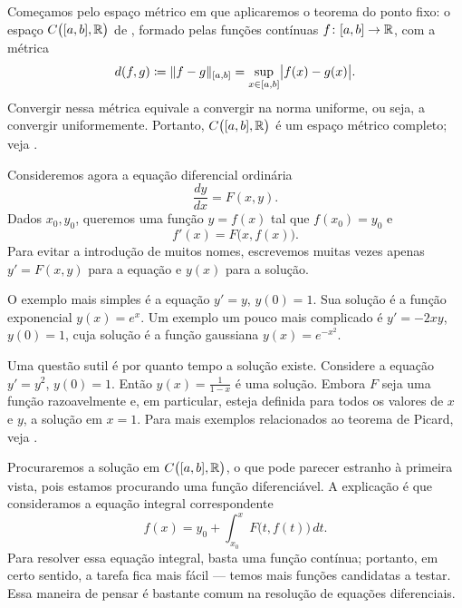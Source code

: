 Começamos pelo espaço métrico em que aplicaremos o
teorema do ponto fixo:
o espaço $C\bigl([a,b],{\mathbb{R}}\bigr)$ de ,
formado pelas funções contínuas $f \colon [a,b] \to {\mathbb{R}}$, com a métrica
\begin{equation*}
d(f,g) \coloneqq \lVert {f-g} \rVert_{[a,b]} = \sup_{x \in [a,b]} \bigl\lvert {f(x)-g(x)} \bigr\rvert .
\end{equation*}
Convergir nessa métrica equivale a convergir na norma uniforme, ou seja,
a convergir uniformemente. Portanto,
$C\bigl([a,b],{\mathbb{R}}\bigr)$ é um espaço métrico completo;
veja .

\medskip

Consideremos agora a equação diferencial ordinária
\begin{equation*}
\frac{dy}{dx} = F(x,y) .
\end{equation*}
Dados $x_0,y_0$, queremos uma função $y=f(x)$ tal que
$f(x_0) = y_0$ e
\begin{equation*}
f'(x) = F\bigl(x,f(x)\bigr) .
\end{equation*}
Para evitar a introdução de muitos nomes, escrevemos muitas vezes apenas $y' = F(x,y)$
para a equação
e $y(x)$ para a solução.

O exemplo mais simples é a equação $y' = y$, $y(0) = 1$.
Sua solução é a função exponencial $y(x) = e^x$. Um exemplo um pouco mais complicado
é $y' = -2xy$, $y(0) = 1$, cuja solução é a função gaussiana
$y(x) = e^{-x^2}$.

Uma questão sutil é por quanto tempo a solução existe.
Considere a equação $y' = y^2$, $y(0)=1$. Então $y(x) = \frac{1}{1-x}$ é uma
solução. Embora $F$ seja uma função razoavelmente  e, em particular,
esteja definida para todos os valores de $x$ e $y$, a solução  em $x=1$.
Para mais exemplos relacionados ao teorema de Picard, veja .

Procuraremos a solução em
$C\bigl([a,b],{\mathbb{R}}\bigr)$, o que pode parecer estranho à primeira vista, pois
estamos procurando uma função diferenciável.
A explicação é que consideramos a
equação integral correspondente
\begin{equation*}
f(x)
=
y_0 + \int_{x_0}^x F\bigl(t,f(t)\bigr)\,dt .
\end{equation*}
Para resolver essa equação integral, basta uma função contínua; portanto,
em certo sentido, a tarefa fica mais fácil — temos mais funções candidatas
a testar. Essa maneira de pensar é bastante comum na resolução de equações
diferenciais.


